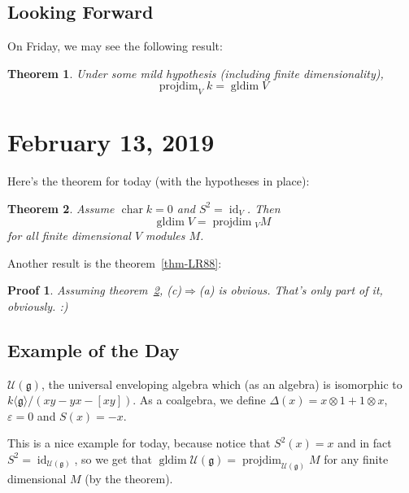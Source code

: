 \documentclass[12pt]{article}
\theoremstyle{break}
\theoremstyle{nonumberbreak}
\theoremstyle{changebreak}
\newtheorem{thm}{Theorem}[subsection]
\theoremstyle{break}
\theoremstyle{nonumberbreak}
\newtheorem{prf}{Proof}
\theoremstyle{nonumberplain}
\theoremstyle{change}
\DeclareMathOperator{\gldim}{gldim}
\DeclareMathOperator{\projdim}{projdim}
\DeclareMathOperator{\ch}{char}
\DeclareMathOperator{\id}{id}
\newcommand*{\g}{\mathfrak{g}}
\begin{document}
\subsection{Looking Forward}
On Friday, we may see the following result:
\begin{thm}
	Under some mild hypothesis (including finite dimensionality),
	\[\projdim_V k=\gldim V\]
\end{thm}

\section{February 13, 2019}
Here's the theorem for today (with the hypotheses in place):
\begin{thm}\label{thm-213}
	Assume $\ch k=0$ and $S^2=\id_V$. Then 
	\[\gldim V=\projdim{_VM}\]
	for all finite dimensional $V$ modules $M$.
\end{thm}
Another result is the theorem~\ref{thm-LR88}:
\begin{prf}
	Assuming theorem~\ref{thm-213}, (c)$\Rightarrow$(a) is obvious. That's only part of it, 
	obviously. :)
\end{prf}
\subsection{Example of the Day}
\begin{ex}
	$\mathcal{U}(\g)$, the universal enveloping algebra which (as an algebra) is isomorphic to
	$k\langle \g\rangle/(xy-yx-[xy])$. As a coalgebra, we define $\Delta(x)=x\otimes 1+1\otimes x$,
	$\varepsilon=0$ and $S(x)=-x$.

	This is a nice example for today, because notice that $S^2(x)=x$ and in fact $S^2=\id_{\mathcal{U}(\g)}$,
	so we get that $\gldim\mathcal{U}(\g)=\projdim_{\mathcal{U}(\g)}M$ for any finite dimensional $M$ (by 
	the theorem).
\end{ex}
\end{document}
